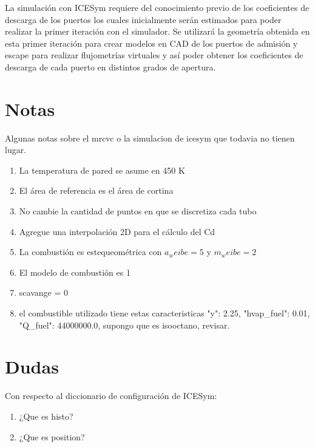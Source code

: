 La simulación con ICESym requiere del conocimiento previo de los coeficientes
de descarga de los puertos los cuales inicialmente serán estimados para poder
realizar la primer iteración con el simulador.
%
Se utilizará la geometría obtenida en esta primer iteración para crear modelos
en CAD de los puertos de admisión y escape para realizar flujometrías virtuales
y así poder obtener los coeficientes de descarga de cada puerto en distintos
grados de apertura.




\section{Notas}
Algunas notas sobre el mrcvc o la simulacion de icesym que todavia no tienen
lugar.

\begin{enumerate}
    \item La temperatura de pared se asume en 450 K
    \item El área de referencia es el área de cortina
    \item No cambie la cantidad de puntos en que se discretiza cada tubo
    \item Agregue una interpolación 2D para el cálculo del Cd
    \item La combustión es estequeométrica con $a_weibe=5$ y $m_weibe=2$
    \item El modelo de combustión es 1
    \item scavange = 0
    \item el combustible utilizado tiene estas caracteristicas "y": 2.25, "hvap_fuel": 0.01, "Q_fuel": 44000000.0, supongo que es isooctano, revisar.

\end{enumerate}

\section{Dudas}
Con respecto al diccionario de configuración de ICESym:

\begin{enumerate}
    \item ¿Que es histo?
    \item ¿Que es position?
\end{enumerate}

